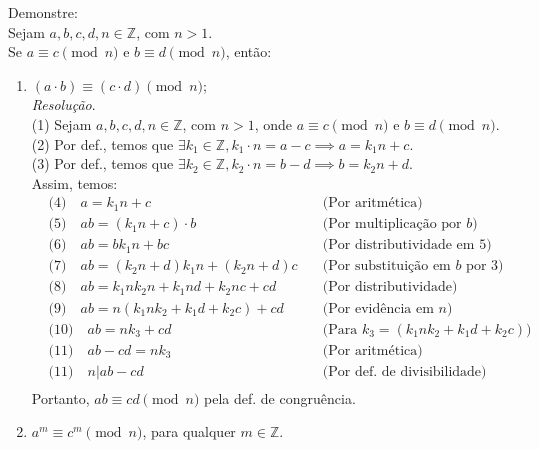 Demonstre: \\
Sejam $a, b, c, d, n \in \mathbb{Z}$, com $n > 1$. \\
Se $a\equiv c \pmod{n}$ e $b\equiv d \pmod{n}$, então:
\begin{enumerate}
	\item $(a \cdot b)\equiv (c \cdot d) \pmod{n}$; \\
	\emph{Resolução}. \\
	(1) Sejam $a, b, c, d, n \in \mathbb{Z}$, com $n > 1$, onde $a\equiv c \pmod{n}$ e $b\equiv d \pmod{n}$. \\
	(2) Por def., temos que $\exists k_1 \in \mathbb{Z}, k_1 \cdot n = a - c \implies a = k_1n + c$. \\
	(3) Por def., temos que $\exists k_2 \in \mathbb{Z}, k_2 \cdot n = b - d \implies b = k_2n + d$. \\
	Assim, temos:
	\begin{align*}
		&\text{(4)} \quad a = k_1n + c &\quad \text{(Por aritmética)} \\
		&\text{(5)} \quad ab = (k_1n + c) \cdot b &\quad \text{(Por multiplicação por $b$)} \\
		&\text{(6)} \quad ab = bk_1n + bc &\quad \text{(Por distributividade em 5)} \\
		&\text{(7)} \quad ab = (k_2n + d)k_1n + (k_2n + d)c &\quad \text{(Por substituição em $b$ por 3)} \\
		&\text{(8)} \quad ab = k_1nk_2n + k_1nd + k_2nc + cd &\quad \text{(Por distributividade)} \\
		&\text{(9)} \quad ab = n (k_1nk_2 + k_1d + k_2c) + cd &\quad \text{(Por evidência em $n$)} \\
		&\text{(10)} \quad ab = nk_3 + cd &\quad \text{(Para $k_3 = (k_1nk_2 + k_1d + k_2c)$)} \\
		&\text{(11)} \quad ab - cd = nk_3 &\quad \text{(Por aritmética)} \\
		&\text{(11)} \quad n | ab - cd &\quad \text{(Por def. de divisibilidade)} \\
	\end{align*}
	Portanto, $ab \equiv cd \pmod{n}$ pela def. de congruência.
	\item $a^m \equiv c^m \pmod{n}$, para qualquer $m \in \mathbb{Z}$.
\end{enumerate}



